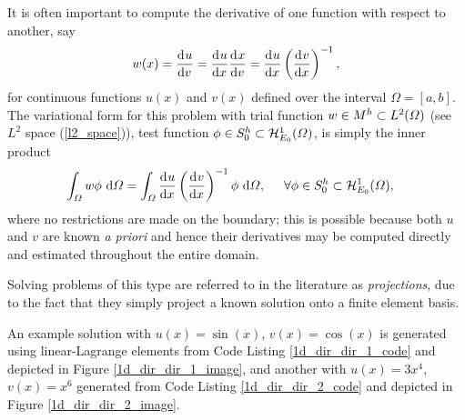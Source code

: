  It is often important to compute the derivative of one function with respect to another, say
  \begin{align}
    \label{1d_example_5}
    w(x) = \frac{\mathrm{d}^{} u}{\mathrm{d} v^{} } = \frac{\mathrm{d}^{} u}{\mathrm{d} x^{} } \frac{\mathrm{d}^{} x}{\mathrm{d} v^{} } = \frac{\mathrm{d}^{} u}{\mathrm{d} x^{} } \left( \frac{\mathrm{d}^{} v}{\mathrm{d} x^{} } \right)^{-1},
  \end{align}
  for continuous functions $u(x)$ and $v(x)$ defined over the interval $\Omega = [a,b]$.  The variational form for this problem with trial function $w \in M^h \subset L^2(\varOmega)$ (see $L^2$ space (\ref{l2_space})), test function $\phi \in S_0^h \subset \mathcal{H}_{E_0}^1(\varOmega)$, is simply the inner product
   \begin{align*}
     \int_{\varOmega} w \phi \ \mathrm{d}\varOmega &= \int_{\varOmega} \frac{\mathrm{d}^{} u}{\mathrm{d} x^{} } \left( \frac{\mathrm{d}^{} v}{\mathrm{d} x^{} } \right)^{-1} \phi \ \mathrm{d}\varOmega, \hspace{5mm} \forall \phi \in S_0^h \subset \mathcal{H}_{E_0}^1(\varOmega),
   \end{align*}
   where no restrictions are made on the boundary; this is possible because both $u$ and $v$ are known \emph{a priori} and hence their derivatives may be computed directly and estimated throughout the entire domain.
   
   Solving problems of this type are referred to in the literature as  \emph{projections}, due to the fact that they simply project a known solution onto a finite element basis.
   
   An example solution with $u(x) = \sin(x)$, $v(x) = \cos(x)$ is generated using linear-Lagrange elements from Code Listing \ref{1d_dir_dir_1_code} and depicted in Figure \ref{1d_dir_dir_1_image},  and another with $u(x) = 3x^4$, $v(x) = x^6$ generated from Code Listing \ref{1d_dir_dir_2_code} and depicted in Figure \ref{1d_dir_dir_2_image}.

  
